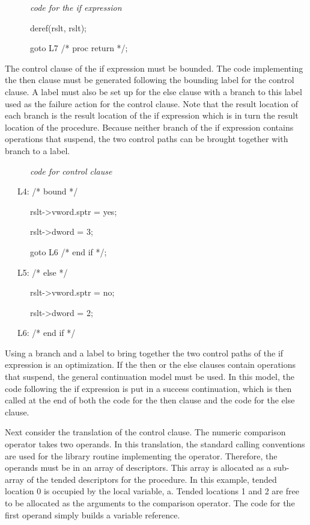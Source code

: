 {\ttfamily\mdseries
\ \ \ \ \ \ \textit{code for the if expression }}

{\ttfamily\mdseries
\ \ \ \ \ \ deref(rslt, rslt);}

{\ttfamily\mdseries
\ \ \ \ \ \ goto L7 /* proc return */;}


The control clause of the if expression must be bounded. The code
implementing the then clause must be generated following the bounding
label for the control clause. A label must also be set up for the else
clause with a branch to this label used as the failure action for the
control clause. Note that the result location of each branch is the
result location of the if expression which is in turn the result
location of the procedure. Because neither branch of the if expression
contains operations that suspend, the two control paths can be brought
together with branch to a label.

{\ttfamily\mdseries
\ \ \ \ \ \ \textit{code for control clause}}

{\ttfamily\mdseries
\ \ \ L4: /* bound */}

{\ttfamily\mdseries
\ \ \ \ \ \ rslt-{\textgreater}vword.sptr = {\textquotedbl}yes{\textquotedbl};}

{\ttfamily\mdseries
\ \ \ \ \ \ rslt-{\textgreater}dword = 3;}

{\ttfamily\mdseries
\ \ \ \ \ \ goto L6 /* end if */;}

{\ttfamily\mdseries
\ \ \ L5: /* else */}

{\ttfamily\mdseries
\ \ \ \ \ \ rslt-{\textgreater}vword.sptr = {\textquotedbl}no{\textquotedbl};}

{\ttfamily\mdseries
\ \ \ \ \ \ rslt-{\textgreater}dword = 2;}

{\ttfamily\mdseries
\ \ \ L6: /* end if */}

Using a branch and a label to bring together the two control paths of
the if expression is an optimization. If the then or the else clauses
contain operations that suspend, the general continuation model must
be used. In this model, the code following the if expression is put in
a success continuation, which is then called at the end of both the
code for the then clause and the code for the else clause.

Next consider the translation of the control clause. The numeric
comparison operator takes two operands. In this translation, the
standard calling conventions are used for the library routine
implementing the operator. Therefore, the operands must be in an array
of descriptors. This array is allocated as a sub-array of the tended
descriptors for the procedure. In this example, tended location 0 is
occupied by the local variable, a. Tended locations 1 and 2 are free
to be allocated as the arguments to the comparison operator. The code
for the first operand simply builds a variable reference.

